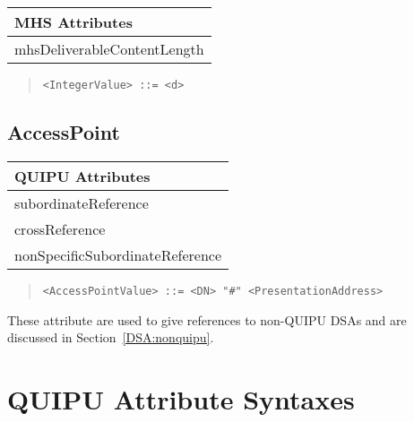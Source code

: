\begin{center}\small
\begin{tabular}{|l|}\hline
MHS Attributes \\ \hline
	mhsDeliverableContentLength\\
\hline
\end{tabular}
\end{center}

\begin{quote}\begin{verbatim}
<IntegerValue> ::= <d>
\end{verbatim}\end{quote}

\subsection{AccessPoint}

\begin{center}\small
\begin{tabular}{|l|}\hline
QUIPU Attributes \\ \hline
	subordinateReference\\
	crossReference\\
	nonSpecificSubordinateReference\\
\hline
\end{tabular}
\end{center}

\begin{quote}\begin{verbatim}
<AccessPointValue> ::= <DN> "#" <PresentationAddress>
\end{verbatim}\end{quote}

These attribute are used to give references to non-QUIPU DSAs and are
discussed in Section~\ref{DSA:nonquipu}.


\section{QUIPU Attribute Syntaxes}

